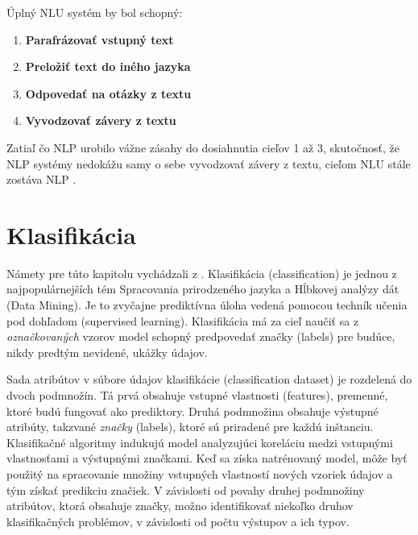 Úplný NLU systém by bol schopný:

\begin{enumerate}
    \item \textbf{Parafrázovať vstupný text}
    \item \textbf{Preložiť text do iného jazyka}
    \item \textbf{Odpovedať na otázky z textu}
    \item \textbf{Vyvodzovať závery z textu}
\end{enumerate}

Zatiaľ čo NLP urobilo vážne zásahy do dosiahnutia cieľov 1 až 3, skutočnosť, že NLP systémy nedokážu samy o sebe vyvodzovať závery z textu, cieľom NLU stále zostáva NLP \cite{Liddy:2001} .

\section{Klasifikácia}
\label{klasifikacia}

Námety pre túto kapitolu vychádzali z \cite{Herrera:2016}. Klasifikácia (classification) je jednou z najpopulárnejších tém Spracovania prirodzeného jazyka a Hĺbkovej analýzy dát (Data Mining). Je to zvyčajne prediktívna úloha vedená pomocou techník učenia pod dohľadom (supervised learning). Klasifikácia má za cieľ naučiť sa z \textit{označkovaných} vzorov model schopný predpovedať značky (labels) pre budúce, nikdy predtým nevidené, ukážky údajov.

Sada atribútov v súbore údajov klasifikácie (classification dataset) je rozdelená do dvoch podmnožín. Tá prvá obsahuje vstupné vlastnosti (features), premenné, ktoré budú fungovať ako prediktory. Druhá podmnožina obsahuje výstupné atribúty, takzvané \textit{značky} (labels), ktoré sú priradené pre každú inštanciu. Klasifikačné algoritmy indukujú model analyzujúci koreláciu medzi vstupnými vlastnosťami a výstupnými značkami. Keď sa získa natrénovaný model, môže byť použitý na spracovanie množiny vstupných vlastností nových vzoriek údajov a tým získať predikciu značiek. V závislosti od povahy druhej podmnožiny atribútov, ktorá obsahuje značky, možno identifikovať niekoľko druhov klasifikačných problémov, v závislosti od počtu výstupov a ich typov. 

